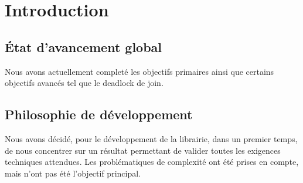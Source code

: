 \section{Introduction}

\subsection{État d’avancement global}
Nous avons actuellement completé les objectifs primaires ainsi que certains objectifs avancés tel que le deadlock de join. 
\subsection{Philosophie de développement}
Nous avons décidé, pour le développement de la librairie, dans un premier temps, de nous concentrer sur un résultat permettant de valider toutes les exigences techniques attendues. Les problématiques de complexité ont été prises en compte, mais n'ont pas été l'objectif principal. 


